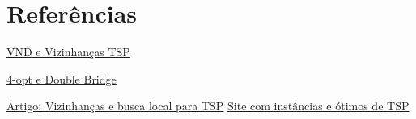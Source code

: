 \documentclass[10pt]{extarticle} %
\begin{document}
\section{Referências}

\noindent \href{https://www.ime.unicamp.br/~chico/mt852/slidesvns.pdf}{VND e Vizinhanças TSP}

\noindent \href{https://tsp-basics.blogspot.com/2017/04/4-opt-and-double-bridge.html}{4-opt e Double Bridge}

\noindent \href{https://pdf.sciencedirectassets.com/778416/1-s2.0-S2192440621X00032/1-s2.0-S2192440622000053/main.pdf?X-Amz-Security-Token=IQoJb3JpZ2luX2VjEGgaCXVzLWVhc3QtMSJHMEUCIQCiKX487R4VSubTVZyJ3nmzsr91E8CitBZ2u1esa5Ap%2BgIgZE3ErxfV6ee7CfmqBW1FJezbVbzNnEfUOTDi8u2eYy4qsgUIIRAFGgwwNTkwMDM1NDY4NjUiDE6%2FcXXDbvb87a6k6yqPBeDvVEbzubwNBJxQLq2ZfEFIgezjYHJ37BKKl7DkQTiUiGlR940eRdZeX5%2B%2FXlIHNqLxEK5fPTPufa2lnXR2V1i3cicZIHVcAnOphaIoHFFn1XpdBf9Y3K3GTceHB8Wqrpa7B1WEJ0F%2BdhTeqbJguVU8pUOWIaK8OYLcpOpVOsx5s1lPdKKt5G6d727Sep%2B6U2293QjHwhAsmv4m%2FYzYvLEDJMPjsBimlC6HAuWXRzE6sy8Cg%2BWRgopHhMQyPJbeZkg%2BWaM8K3U2Ve2DhIpsJHHG5u9Wh6iZb9%2FtG5Cy5M55JbebjoWvJzS%2FrSce8ZTqNKH5AvwB9L8ONK3zAAdRjBql7QraDrPlBFvm85QYMVbp4QcSmQZE08%2BsDiMM3T44lp5KI64W3EdCbfxcre7uuOqCJbCIPZa2nTp6oNQxXobgs%2BRcnH5llvqh%2FiQV7OYmixz0JL%2B1G77zjVejfyjoJZueDg846cdLp3uuQ%2FUaTp%2F33gI9aNlr25z1ZZOwRs6uDIrymsKixO9mqz9AUQQmyQ9JqJhtfziMpu2xcNRAb%2Fn4DADUouoMiRgrkf%2F0PPJXbKx%2Fg9%2B%2BfVw71Jjcot1ltoORZpNnB1zS58zJWuHIiazPMcPLWhZmcHFSnpMg7yCSp9V0zgmbRNQ%2BpITx13WcijwWS6wm2q8cAY9NecqHpCrM9EP%2FETGgQEP3GGt%2FDiPDIpQcCPLByMOCWq%2FrGdguATbTA7tv1j3XdK2zP1Js27tZKr7LNkHWknxeMt%2Fagvm7N8z7DMNWHxQHxwat80XbVIRcl3DUI36iSsxPsotGRZjs7rDE9iq35YAqH66mIRfMZpYPR3m7OVANQnRSUgEX3Aexlhog87hocSBbRpp9CvowxfrIugY6sQElo7d9%2FrPJJMb5SD49lLtjMVZCHEALt8ys4xrG2ki6gs%2FiHxuRYftgR8EGKZccgJW1f1QYj9YZcuhSyh86SQieHu070LQ3%2FP%2BXD6RS8lSZ8IcLSvtbJ9OsItDYD1z0gbFXmngDY8LFuQCPED6T%2BE7Jie%2FtLuh4JRspzdo1zYN6RunacR5rICFdmiQTrGnKDi%2B1XhJGQlVvzPakGtpBYnAVdqyk5Cmjp4SPP907S3tUt4I%3D&X-Amz-Algorithm=AWS4-HMAC-SHA256&X-Amz-Date=20241206T010734Z&X-Amz-SignedHeaders=host&X-Amz-Expires=300&X-Amz-Credential=ASIAQ3PHCVTY3IP7EX5J%2F20241206%2Fus-east-1%2Fs3%2Faws4_request&X-Amz-Signature=8b6208d83247bb9adca2d15311874678315c251c696ea5cb7dd1c74d66e6170c&hash=e64ef5f85fe0367ad62d087fd1bbcbf3b36ac468af0acc60ed8633cad3c89a7b&host=68042c943591013ac2b2430a89b270f6af2c76d8dfd086a07176afe7c76c2c61&pii=S2192440622000053&tid=spdf-125af566-425d-428e-9fe7-2128106a5dd4&sid=d7b580137b8be84f217b42c3dc0433ee14a8gxrqa&type=client&tsoh=d3d3LnNjaWVuY2VkaXJlY3QuY29t&ua=0c125c050159585351&rr=8ed8613df8668c5b&cc=br}{Artigo: Vizinhanças e busca local para TSP}
\noindent \href{http://comopt.ifi.uni-heidelberg.de/software/TSPLIB95/}{Site com instâncias e ótimos de TSP}
\end{document}
